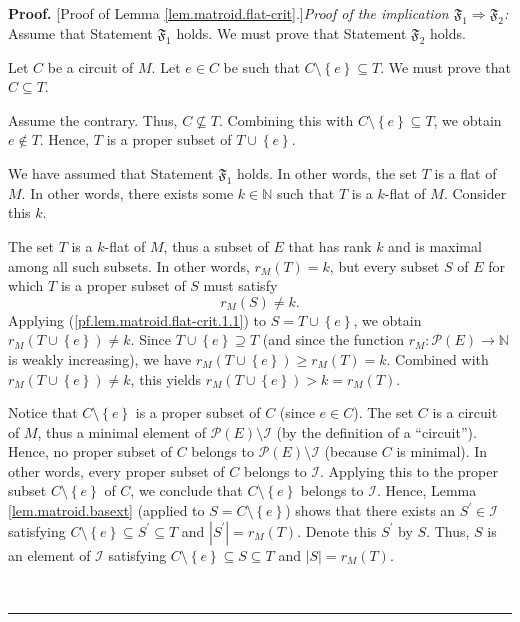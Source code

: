 \documentclass[numbers=enddot,12pt,final,onecolumn,notitlepage]{scrartcl}%
\theoremstyle{definition}
\newenvironment{proof}[1][Proof]{\noindent\textbf{#1.} }{\ \rule{0.5em}{0.5em}}
\begin{document}
\begin{proof}
[Proof of Lemma \ref{lem.matroid.flat-crit}.]\textit{Proof of the implication
$\mathfrak{F}_{1}\Longrightarrow\mathfrak{F}_{2}$:} Assume that Statement
$\mathfrak{F}_{1}$ holds. We must prove that Statement $\mathfrak{F}_{2}$ holds.

Let $C$ be a circuit of $M$. Let $e\in C$ be such that $C\setminus\left\{
e\right\}  \subseteq T$. We must prove that $C\subseteq T$.

Assume the contrary. Thus, $C\not \subseteq T$. Combining this with
$C\setminus\left\{  e\right\}  \subseteq T$, we obtain $e\notin T$. Hence, $T$
is a proper subset of $T\cup\left\{  e\right\}  $.

We have assumed that Statement $\mathfrak{F}_{1}$ holds. In other words, the
set $T$ is a flat of $M$. In other words, there exists some $k\in\mathbb{N}$
such that $T$ is a $k$-flat of $M$. Consider this $k$.

The set $T$ is a $k$-flat of $M$, thus a subset of $E$ that has rank $k$ and
is maximal among all such subsets. In other words, $r_{M}\left(  T\right)
=k$, but every subset $S$ of $E$ for which $T$ is a proper subset of $S$ must
satisfy%
\begin{equation}
r_{M}\left(  S\right)  \neq k. \label{pf.lem.matroid.flat-crit.1.1}%
\end{equation}
Applying (\ref{pf.lem.matroid.flat-crit.1.1}) to $S=T\cup\left\{  e\right\}
$, we obtain $r_{M}\left(  T\cup\left\{  e\right\}  \right)  \neq k$. Since
$T\cup\left\{  e\right\}  \supseteq T$ (and since the function $r_{M}%
:\mathcal{P}\left(  E\right)  \rightarrow\mathbb{N}$ is weakly increasing), we
have $r_{M}\left(  T\cup\left\{  e\right\}  \right)  \geq r_{M}\left(
T\right)  =k$. Combined with $r_{M}\left(  T\cup\left\{  e\right\}  \right)
\neq k$, this yields $r_{M}\left(  T\cup\left\{  e\right\}  \right)
>k=r_{M}\left(  T\right)  $.

Notice that $C\setminus\left\{  e\right\}  $ is a proper subset of $C$ (since
$e\in C$). The set $C$ is a circuit of $M$, thus a minimal element of
$\mathcal{P}\left(  E\right)  \setminus\mathcal{I}$ (by the definition of a
\textquotedblleft circuit\textquotedblright). Hence, no proper subset of $C$
belongs to $\mathcal{P}\left(  E\right)  \setminus\mathcal{I}$ (because $C$ is
minimal). In other words, every proper subset of $C$ belongs to $\mathcal{I}$.
Applying this to the proper subset $C\setminus\left\{  e\right\}  $ of $C$, we
conclude that $C\setminus\left\{  e\right\}  $ belongs to $\mathcal{I}$.
Hence, Lemma \ref{lem.matroid.basext} (applied to $S=C\setminus\left\{
e\right\}  $) shows that there exists an $S^{\prime}\in\mathcal{I}$ satisfying
$C\setminus\left\{  e\right\}  \subseteq S^{\prime}\subseteq T$ and
$\left\vert S^{\prime}\right\vert =r_{M}\left(  T\right)  $. Denote this
$S^{\prime}$ by $S$. Thus, $S$ is an element of $\mathcal{I}$ satisfying
$C\setminus\left\{  e\right\}  \subseteq S\subseteq T$ and $\left\vert
S\right\vert =r_{M}\left(  T\right)  $.


\end{proof}
\end{document}
